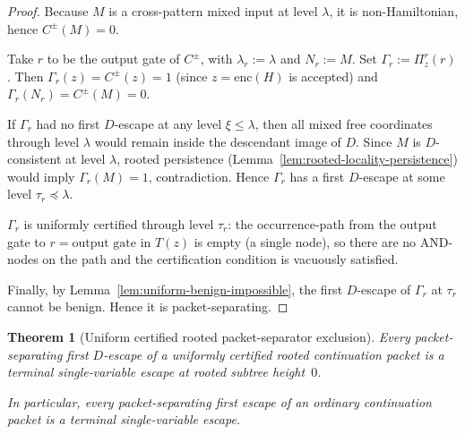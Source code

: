\documentclass[11pt]{article}
\newtheorem{theorem}{Theorem}[section]
\begin{document}
\begin{proof}
Because $M$ is a cross-pattern mixed input at level $\lambda$, it is
non-Hamiltonian, hence $C^\pm(M) = 0$.

Take $r$ to be the output gate of $C^{\pm}$, with $\lambda_r := \lambda$
and $N_r := M$.  Set $\Gamma_r := \Pi^r_z(r)$.  Then
$\Gamma_r(z) = C^{\pm}(z) = 1$ (since $z = \mathrm{enc}(H)$ is accepted)
and $\Gamma_r(N_r) = C^{\pm}(M) = 0$.

If $\Gamma_r$ had no first $D$-escape at any level $\xi \le \lambda$,
then all mixed free coordinates through level $\lambda$ would remain
inside the descendant image of $D$.  Since $M$ is $D$-consistent at
level $\lambda$, rooted persistence
(Lemma~\ref{lem:rooted-locality-persistence}) would imply
$\Gamma_r(M) = 1$, contradiction.  Hence $\Gamma_r$ has a first
$D$-escape at some level $\tau_r \preceq \lambda$.

$\Gamma_r$ is uniformly certified through level $\tau_r$: the
occurrence-path from the output gate to $r = \text{output gate}$ in
$T(z)$ is empty (a single node), so there are no AND-nodes on the path
and the certification condition is vacuously satisfied.

Finally, by Lemma~\ref{lem:uniform-benign-impossible}, the first
$D$-escape of $\Gamma_r$ at $\tau_r$ cannot be benign.  Hence it is
packet-separating.
\end{proof}

\begin{theorem}[Uniform certified rooted packet-separator exclusion]
\label{thm:packet-separator-exclusion}
Every packet-separating first $D$-escape of a uniformly certified
rooted continuation packet is a terminal single-variable escape at
rooted subtree height~$0$.

In particular, every packet-separating first escape of an ordinary
continuation packet is a terminal single-variable escape.
\end{theorem}
\end{document}
